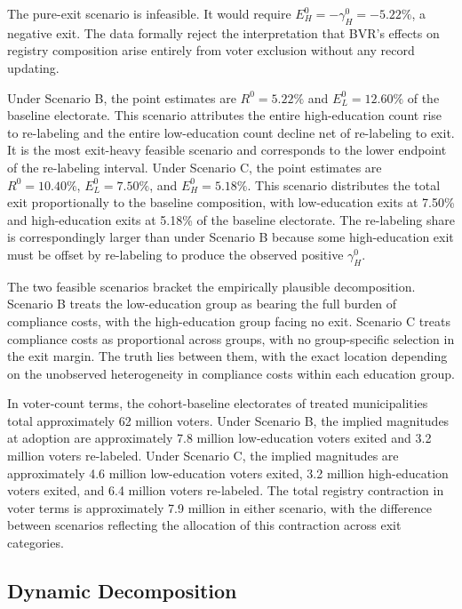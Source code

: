 The pure-exit scenario is infeasible. It would require $E_H^0 = -\gamma_H^0 = -5.22\%$, a negative exit. The data formally reject the interpretation that BVR's effects on registry composition arise entirely from voter exclusion without any record updating.

Under Scenario B, the point estimates are $R^0 = 5.22\%$ and $E_L^0 = 12.60\%$ of the baseline electorate. This scenario attributes the entire high-education count rise to re-labeling and the entire low-education count decline net of re-labeling to exit. It is the most exit-heavy feasible scenario and corresponds to the lower endpoint of the re-labeling interval. Under Scenario C, the point estimates are $R^0 = 10.40\%$, $E_L^0 = 7.50\%$, and $E_H^0 = 5.18\%$. This scenario distributes the total exit proportionally to the baseline composition, with low-education exits at 7.50\% and high-education exits at 5.18\% of the baseline electorate. The re-labeling share is correspondingly larger than under Scenario B because some high-education exit must be offset by re-labeling to produce the observed positive $\gamma_H^0$.

The two feasible scenarios bracket the empirically plausible decomposition. Scenario B treats the low-education group as bearing the full burden of compliance costs, with the high-education group facing no exit. Scenario C treats compliance costs as proportional across groups, with no group-specific selection in the exit margin. The truth lies between them, with the exact location depending on the unobserved heterogeneity in compliance costs within each education group.

In voter-count terms, the cohort-baseline electorates of treated municipalities total approximately 62 million voters. Under Scenario B, the implied magnitudes at adoption are approximately 7.8 million low-education voters exited and 3.2 million voters re-labeled. Under Scenario C, the implied magnitudes are approximately 4.6 million low-education voters exited, 3.2 million high-education voters exited, and 6.4 million voters re-labeled. The total registry contraction in voter terms is approximately 7.9 million in either scenario, with the difference between scenarios reflecting the allocation of this contraction across exit categories.

\subsection{Dynamic Decomposition}
\label{ssec:decomposition_dynamic}

